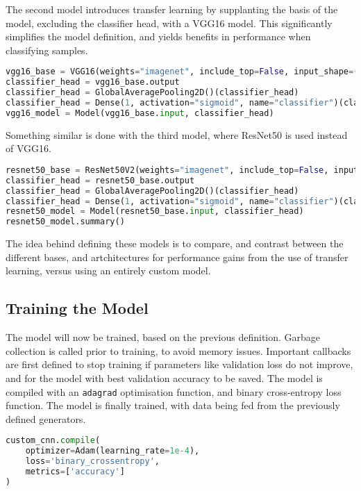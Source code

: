 \documentclass[../main]{subfiles}
\begin{document}
\noindent The second model introduces transfer learning by supplanting the basis
of the model, excluding the classifier head, with a VGG16 model. This
significantly simplifies the model definition, and yields benefits in
performance when classifying samples.

\begin{lstlisting}[language=Python, caption={VGG16 model definition.}]
vgg16_base = VGG16(weights="imagenet", include_top=False, input_shape=(299, 299, 3))
classifier_head = vgg16_base.output
classifier_head = GlobalAveragePooling2D()(classifier_head)
classifier_head = Dense(1, activation="sigmoid", name="classifier")(classifier_head)
vgg16_model = Model(vgg16_base.input, classifier_head)
\end{lstlisting}

\noindent Something similar is done with the third model, where ResNet50 is used instead of VGG16.

\begin{lstlisting}[language=Python, caption={ResNet50 model definition.}]
resnet50_base = ResNet50V2(weights="imagenet", include_top=False, input_shape=(299, 299, 3))
classifier_head = resnet50_base.output
classifier_head = GlobalAveragePooling2D()(classifier_head)
classifier_head = Dense(1, activation="sigmoid", name="classifier")(classifier_head)
resnet50_model = Model(resnet50_base.input, classifier_head)
resnet50_model.summary()
\end{lstlisting}

\noindent The idea behind defining these models is to compare, and contrast
between the different bases, and artchitectures for performance gains from the
use of transfer learning, versus using an entirely custom model.

\subsection{Training the Model}
The model will now be trained, based on the previous definition. Garbage
collection is called prior to training, to avoid memory issues. Important
callbacks are first defined to stop training if parameters like validation loss
do not improve, and for the model with best validation accuracy to be saved. The
model is compiled with an \texttt{adagrad} optimisation function, and binary
cross-entropy loss function. The model is finally trained, with data being fed
from the previously defined generators.

\begin{lstlisting}[language=Python, caption={Compiling the custom CNN using the Adam optimiser, and a binary cross-entropy loss function.}]
custom_cnn.compile(
    optimizer=Adam(learning_rate=1e-4),
    loss='binary_crossentropy',
    metrics=['accuracy']
)
\end{lstlisting}
\end{document}
